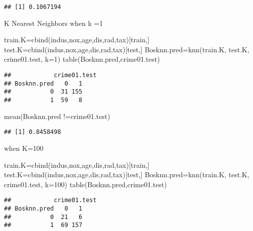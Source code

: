 \documentclass[
]{article}
\newenvironment{Shaded}{\begin{snugshade}}{\end{snugshade}}
\newcommand{\AttributeTok}[1]{\textcolor[rgb]{0.77,0.63,0.00}{#1}}
\newcommand{\DecValTok}[1]{\textcolor[rgb]{0.00,0.00,0.81}{#1}}
\newcommand{\FunctionTok}[1]{\textcolor[rgb]{0.00,0.00,0.00}{#1}}
\newcommand{\NormalTok}[1]{#1}
\newcommand{\OtherTok}[1]{\textcolor[rgb]{0.56,0.35,0.01}{#1}}
\newcommand{\SpecialCharTok}[1]{\textcolor[rgb]{0.00,0.00,0.00}{#1}}
\begin{document}
\begin{verbatim}
## [1] 0.1067194
\end{verbatim}

K Nearest Neighbors when k =1

\begin{Shaded}
\begin{Highlighting}[]
\NormalTok{train.K}\OtherTok{=}\FunctionTok{cbind}\NormalTok{(indus,nox,age,dis,rad,tax)[train,]}
\NormalTok{test.K}\OtherTok{=}\FunctionTok{cbind}\NormalTok{(indus,nox,age,dis,rad,tax)[test,]}
\NormalTok{Bosknn.pred}\OtherTok{=}\FunctionTok{knn}\NormalTok{(train.K, test.K, crime01.test, }\AttributeTok{k=}\DecValTok{1}\NormalTok{)}
\FunctionTok{table}\NormalTok{(Bosknn.pred,crime01.test)}
\end{Highlighting}
\end{Shaded}

\begin{verbatim}
##            crime01.test
## Bosknn.pred   0   1
##           0  31 155
##           1  59   8
\end{verbatim}

\begin{Shaded}
\begin{Highlighting}[]
\FunctionTok{mean}\NormalTok{(Bosknn.pred }\SpecialCharTok{!=}\NormalTok{crime01.test)}
\end{Highlighting}
\end{Shaded}

\begin{verbatim}
## [1] 0.8458498
\end{verbatim}

when K=100

\begin{Shaded}
\begin{Highlighting}[]
\NormalTok{train.K}\OtherTok{=}\FunctionTok{cbind}\NormalTok{(indus,nox,age,dis,rad,tax)[train,]}
\NormalTok{test.K}\OtherTok{=}\FunctionTok{cbind}\NormalTok{(indus,nox,age,dis,rad,tax)[test,]}
\NormalTok{Bosknn.pred}\OtherTok{=}\FunctionTok{knn}\NormalTok{(train.K, test.K, crime01.test, }\AttributeTok{k=}\DecValTok{100}\NormalTok{)}
\FunctionTok{table}\NormalTok{(Bosknn.pred,crime01.test)}
\end{Highlighting}
\end{Shaded}

\begin{verbatim}
##            crime01.test
## Bosknn.pred   0   1
##           0  21   6
##           1  69 157
\end{verbatim}
\end{document}
